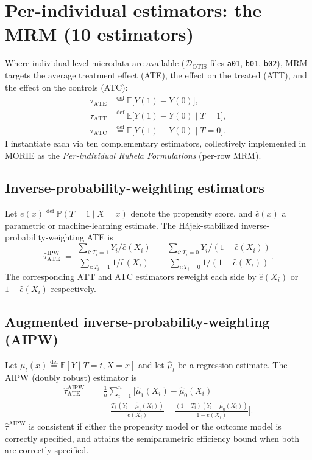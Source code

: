 \documentclass[11pt,a4paper]{article}
\theoremstyle{plain}
\theoremstyle{definition}
\theoremstyle{remark}
\newcommand{\E}{\mathbb{E}}
\newcommand{\PP}{\mathbb{P}}
\newcommand{\eqdef}{\mathrel{\stackrel{\mathrm{def}}{=}}}
\begin{document}
\section{Per-individual estimators: the MRM (10 estimators)}
\label{sec:mrm-perrow}

Where individual-level microdata are available
($\mathcal{D}_{\mathrm{OTIS}}$ files \texttt{a01}, \texttt{b01},
\texttt{b02}), MRM targets the average treatment effect (ATE),
the effect on the treated (ATT), and the effect on the controls
(ATC):
\begin{align}
  \tau_{\mathrm{ATE}} &\eqdef
    \E\bigl[Y(1) - Y(0)\bigr],
  \label{eq:ate} \\
  \tau_{\mathrm{ATT}} &\eqdef
    \E\bigl[Y(1) - Y(0) \;\big|\; T = 1\bigr],
  \label{eq:att} \\
  \tau_{\mathrm{ATC}} &\eqdef
    \E\bigl[Y(1) - Y(0) \;\big|\; T = 0\bigr].
  \label{eq:atc}
\end{align}
I instantiate each via ten complementary estimators, collectively
implemented in MORIE as the \emph{Per-individual Ruhela
Formulations} (per-row MRM).

\subsection{Inverse-probability-weighting estimators}

Let $e(x) \eqdef \PP(T = 1 \mid X = x)$ denote the propensity
score, and $\hat{e}(x)$ a parametric or machine-learning
estimate. The H\'ajek-stabilized inverse-probability-weighting
ATE is
\begin{equation}
  \widehat{\tau}^{\mathrm{IPW}}_{\mathrm{ATE}}
  \;=\;
  \frac{\sum_{i : T_i = 1} Y_i / \hat{e}(X_i)}
       {\sum_{i : T_i = 1} 1 / \hat{e}(X_i)}
  \;-\;
  \frac{\sum_{i : T_i = 0} Y_i / (1 - \hat{e}(X_i))}
       {\sum_{i : T_i = 0} 1 / (1 - \hat{e}(X_i))}.
  \label{eq:ipw-ate}
\end{equation}
The corresponding ATT and ATC estimators reweight each side by
$\hat{e}(X_i)$ or $1 - \hat{e}(X_i)$ respectively.

\subsection{Augmented inverse-probability-weighting (AIPW)}

Let $\mu_{t}(x) \eqdef \E[Y \mid T=t, X=x]$ and let $\hat{\mu}_{t}$
be a regression estimate. The AIPW (doubly robust) estimator is
\begin{align}
  \widehat{\tau}^{\mathrm{AIPW}}_{\mathrm{ATE}}
  &= \frac{1}{n} \sum_{i=1}^{n}
   \biggl[ \hat{\mu}_{1}(X_i) - \hat{\mu}_{0}(X_i)
   \nonumber \\
  &\quad
   + \frac{T_i\,(Y_i - \hat{\mu}_{1}(X_i))}{\hat{e}(X_i)}
   - \frac{(1-T_i)(Y_i - \hat{\mu}_{0}(X_i))}{1 - \hat{e}(X_i)}
   \biggr].
  \label{eq:aipw-ate}
\end{align}
$\widehat{\tau}^{\mathrm{AIPW}}$ is consistent if either the
propensity model or the outcome model is correctly specified, and
attains the semiparametric efficiency bound when both are
correctly specified.
\end{document}
